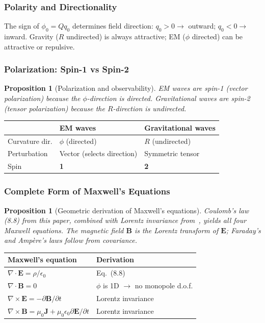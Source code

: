 \documentclass[12pt,a4paper]{article}
\newtheorem{proposition}[theorem]{Proposition}
\begin{document}
\subsubsection{Polarity and Directionality}

The sign of $\phi_0 = Qq_0$ determines field direction: $q_0 > 0 \to$ outward; $q_0 < 0 \to$ inward. Gravity ($R$ undirected) is always attractive; EM ($\phi$ directed) can be attractive or repulsive.

\subsubsection{Polarization: Spin-1 vs Spin-2}

\begin{proposition}[Polarization and observability]\label{prop:polar}
EM waves are spin-1 (vector polarization) because the $\phi$-direction is directed. Gravitational waves are spin-2 (tensor polarization) because the $R$-direction is undirected.
\end{proposition}

\begin{center}
\begin{tabular}{lll}
\toprule
 & EM waves & Gravitational waves \\
\midrule
Curvature dir. & $\phi$ (directed) & $R$ (undirected) \\
Perturbation & Vector (selects direction) & Symmetric tensor \\
Spin & \textbf{1} & \textbf{2} \\
\bottomrule
\end{tabular}
\end{center}

\subsubsection{Complete Form of Maxwell's Equations}

\begin{proposition}[Geometric derivation of Maxwell's equations]\label{prop:maxwell}
Coulomb's law (8.8) from this paper, combined with Lorentz invariance from~\cite{Paper2}, yields all four Maxwell equations. The magnetic field $\mathbf{B}$ is the Lorentz transform of $\mathbf{E}$; Faraday's and Amp\`{e}re's laws follow from covariance.
\end{proposition}

\begin{center}
\begin{tabular}{ll}
\toprule
Maxwell's equation & Derivation \\
\midrule
$\nabla \cdot \mathbf{E} = \rho/\epsilon_0$ & Eq.~(8.8) \\
$\nabla \cdot \mathbf{B} = 0$ & $\phi$ is 1D $\to$ no monopole d.o.f. \\
$\nabla \times \mathbf{E} = -\partial\mathbf{B}/\partial t$ & Lorentz invariance~\cite{Paper2} \\
$\nabla \times \mathbf{B} = \mu_0\mathbf{J} + \mu_0\epsilon_0\partial\mathbf{E}/\partial t$ & Lorentz invariance~\cite{Paper2} \\
\bottomrule
\end{tabular}
\end{center}
\end{document}
